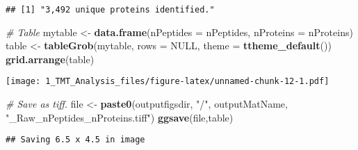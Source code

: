 \documentclass[]{article}
\newenvironment{Shaded}{\begin{snugshade}}{\end{snugshade}}
\newcommand{\KeywordTok}[1]{\textcolor[rgb]{0.13,0.29,0.53}{\textbf{#1}}}
\newcommand{\DataTypeTok}[1]{\textcolor[rgb]{0.13,0.29,0.53}{#1}}
\newcommand{\StringTok}[1]{\textcolor[rgb]{0.31,0.60,0.02}{#1}}
\newcommand{\CommentTok}[1]{\textcolor[rgb]{0.56,0.35,0.01}{\textit{#1}}}
\newcommand{\OtherTok}[1]{\textcolor[rgb]{0.56,0.35,0.01}{#1}}
\newcommand{\OperatorTok}[1]{\textcolor[rgb]{0.81,0.36,0.00}{\textbf{#1}}}
\newcommand{\NormalTok}[1]{#1}
\begin{document}
\begin{Shaded}
\end{Shaded}

\begin{verbatim}
## [1] "3,492 unique proteins identified."
\end{verbatim}

\begin{Shaded}
\begin{Highlighting}[]
\CommentTok{# Table}
\NormalTok{mytable <-}\StringTok{ }\KeywordTok{data.frame}\NormalTok{(}\DataTypeTok{nPeptides =}\NormalTok{ nPeptides,}
                         \DataTypeTok{nProteins =}\NormalTok{ nProteins)}
\NormalTok{table <-}\StringTok{ }\KeywordTok{tableGrob}\NormalTok{(mytable, }\DataTypeTok{rows =} \OtherTok{NULL}\NormalTok{, }\DataTypeTok{theme =} \KeywordTok{ttheme_default}\NormalTok{())}
\KeywordTok{grid.arrange}\NormalTok{(table)}
\end{Highlighting}
\end{Shaded}

\texttt{[image: 1\_TMT\_Analysis\_files/figure-latex/unnamed-chunk-12-1.pdf]}

\begin{Shaded}
\begin{Highlighting}[]
\CommentTok{# Save as tiff.}
\NormalTok{file <-}\StringTok{ }\KeywordTok{paste0}\NormalTok{(outputfigsdir, }\StringTok{"/"}\NormalTok{, outputMatName, }\StringTok{"_Raw_nPeptides_nProteins.tiff"}\NormalTok{)}
\KeywordTok{ggsave}\NormalTok{(file,table)}
\end{Highlighting}
\end{Shaded}

\begin{verbatim}
## Saving 6.5 x 4.5 in image
\end{verbatim}
\end{document}
